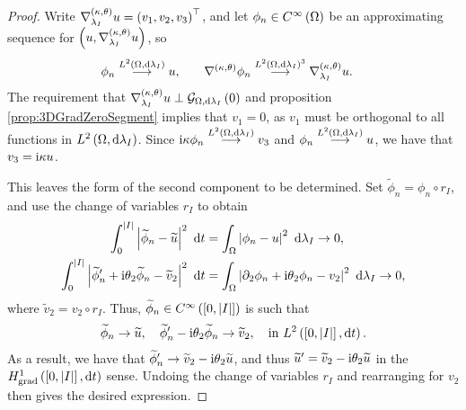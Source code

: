 \begin{proof}
	Write $\nabla^{\left( \kappa, \theta \right)}_{\lambda_I} u = \left( v_1, v_2, v_3 \right)^\top$, and let $\phi_n\in C^{\infty}\left( \Omega \right)$ be an approximating sequence for $\left( u, \nabla^{\left( \kappa, \theta \right)}_{\lambda_I}u \right)$, so
	\begin{align*}
		\phi_n \overset{L^{2}\left( \Omega,\mathrm{d}\lambda_I \right)}{\longrightarrow} u, &\qquad \nabla^{\left( \kappa, \theta \right)}\phi_n \overset{L^{2}\left( \Omega,\mathrm{d}\lambda_I \right)^3}{\longrightarrow}\nabla^{\left( \kappa, \theta \right)}_{\lambda_I}u.
	\end{align*}
	The requirement that $\nabla^{\left( \kappa, \theta \right)}_{\lambda_I} u \perp \mathcal{G}_{ \Omega, \mathrm{d}\lambda_I}\left( 0 \right)$ and proposition \ref{prop:3DGradZeroSegment} implies that $v_1=0$, as $v_1$ must be orthogonal to all functions in $L^{2}\left( \Omega,\mathrm{d}\lambda_I \right)$.
	Since $\mathrm{i}\kappa\phi_n\overset{L^{2}\left( \Omega,\mathrm{d}\lambda_I \right)}{\longrightarrow} v_3$ and $\phi_n\overset{L^{2}\left( \Omega,\mathrm{d}\lambda_I \right)}{\longrightarrow}u$, we have that $v_3 = \mathrm{i}\kappa u$.
	
	This leaves the form of the second component to be determined.
	Set $\widetilde{\phi}_n = \phi_n \circ r_I$, and use the change of variables $r_I$ to obtain
	\begin{align*}
		\int_0^{\abs{I}} \abs{ \widetilde{\phi}_n - \widetilde{u} }^2 \ \md t 
		&= \integral{\ddom}{ \abs{ \phi_n - u }^2 }{\lambda_I} \rightarrow 0, \\
		\int_0^{\abs{I}} \abs{ \widetilde{\phi}'_n + \rmi\qm_2\widetilde{\phi}_n - \widetilde{v}_2 }^2 \ \md t 
		&= \integral{\ddom}{ \abs{ \partial_2\phi_n + \rmi\qm_2\phi_n - v_2 }^2 }{\lambda_I} \rightarrow 0,
	\end{align*}
	where $\widetilde{v}_2 = v_2\circ r_I$.
	Thus, $\widetilde{\phi}_n\in C^{\infty}\left( \left[ 0,\left\lvert I \right\rvert \right] \right)$ is such that
	\begin{align*}
		\widetilde{\phi}_n \rightarrow \widetilde{u}, \quad
		\widetilde{\phi}'_n - \mathrm{i}\theta_2\widetilde{\phi}_n \rightarrow \widetilde{v}_2, \quad
		\text{in } L^{2}\left( \left[ 0,\left\lvert I \right\rvert \right],\mathrm{d}t \right).
	\end{align*}
	As a result, we have that $\widetilde{\phi}'_n \rightarrow  \widetilde{v}_2 - \mathrm{i}\theta_2\widetilde{u}$, and thus $\widetilde{u}' = \widetilde{v}_2 - \mathrm{i}\theta_2\widetilde{u}$ in the $H^1_\mathrm{grad}\left( \left[ 0,\left\lvert I \right\rvert \right], \mathrm{d}t \right)$ sense.
	Undoing the change of variables $r_I$ and rearranging for $v_2$ then gives the desired expression.
\end{proof}

